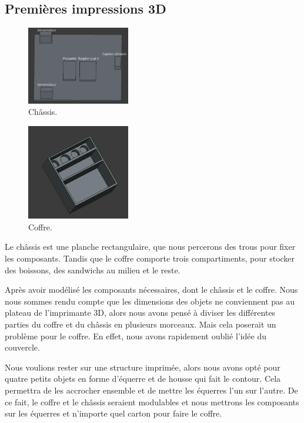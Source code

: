 \documentclass[a4paper,12pt]{report}  %
\begin{document}
\subsection{Premières impressions 3D}

\begin{figure}[H]
	\centering
	\includegraphics[width=0.4\textwidth]{./attachments/cad_planche_v2.png}
	\caption{Châssis.}
\end{figure}

\begin{figure}[H]
	\centering
	\includegraphics[width=0.4\textwidth]{./attachments/cad_coffre.jpg}
	\caption{Coffre.}
\end{figure}


Le châssis est une planche rectangulaire, que nous percerons des trous pour fixer les composants. Tandis que le coffre comporte trois compartiments, pour stocker des boissons, des sandwichs au milieu et le reste.

Après avoir modélisé les composants nécessaires, dont le châssis et le coffre. Nous nous sommes rendu compte que les dimensions des objets ne conviennent pas au plateau de l’imprimante 3D, alors nous avons pensé à diviser les différentes parties du coffre et du châssis en plusieurs morceaux. Mais cela poserait un problème pour le coffre. En effet, nous avons rapidement oublié l’idée du couvercle.

Nous voulions rester sur une structure imprimée, alors nous avons opté pour quatre petits objets en forme d'équerre et de housse qui fait le contour. Cela permettra de les accrocher ensemble et de mettre les équerres l’un sur l’autre. De ce fait, le coffre et le châssis seraient modulables et nous mettrons les composants sur les équerres et n’importe quel carton pour faire le coffre.
\end{document}

